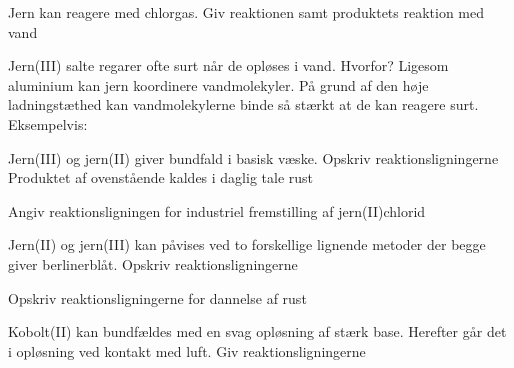 \begin{flashcard}[Reaktion]{Jern kan reagere med chlorgas. Giv reaktionen samt produktets reaktion med vand}
\\\vspace*{0.5cm}
\end{flashcard}

\begin{flashcard}[Egenskab]{Jern(III) salte regarer ofte surt når de opløses i vand. Hvorfor?}
Ligesom aluminium kan jern koordinere vandmolekyler. På grund af den høje ladningstæthed kan vandmolekylerne binde så stærkt at de kan reagere surt.\\
Eksempelvis:\\
\end{flashcard}

\begin{flashcard}[Reaktion]{Jern(III) og jern(II) giver bundfald i basisk væske. Opskriv reaktionsligningerne}
\\
Produktet af ovenstående kaldes i daglig tale rust
\end{flashcard}

\begin{flashcard}[Fremstilling]{Angiv reaktionsligningen for industriel fremstilling af jern(II)chlorid}
\end{flashcard}

\begin{flashcard}[Reaktion]{Jern(II) og jern(III) kan påvises ved to forskellige lignende metoder der begge giver berlinerblåt. Opskriv reaktionsligningerne}
\\\vspace*{0.5cm}
\end{flashcard}

\begin{flashcard}[Reaktion]{Opskriv reaktionsligningerne for dannelse af rust}
\\\vspace*{0.5cm}
\end{flashcard}

\begin{flashcard}[Reaktion]{Kobolt(II) kan bundfældes med en svag opløsning af stærk base. Herefter går det i opløsning ved kontakt med luft. Giv reaktionsligningerne}
\\\vspace*{0.5cm}
\end{flashcard}

